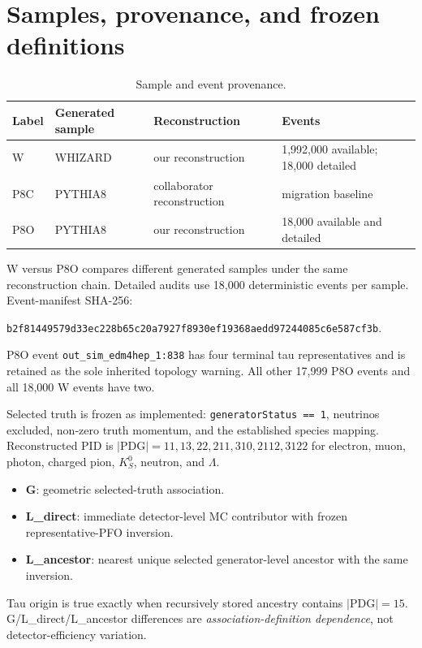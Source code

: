 \documentclass[11pt,a4paper]{article}
\newcommand{\code}[1]{\texttt{#1}}
\begin{document}
\section{Samples, provenance, and frozen definitions}

\begin{table}[H]\centering
\caption{Sample and event provenance.}
\begin{tabular}{llll}
\toprule Label & Generated sample & Reconstruction & Events \\
\midrule
W & WHIZARD & our reconstruction & 1,992,000 available; 18,000 detailed \\
P8C & PYTHIA8 & collaborator reconstruction & migration baseline \\
P8O & PYTHIA8 & our reconstruction & 18,000 available and detailed \\
\bottomrule
\end{tabular}
\end{table}

W versus P8O compares different generated samples under the same reconstruction chain. Detailed audits use 18,000 deterministic events per sample. Event-manifest SHA-256:
\begin{center}\small\code{b2f81449579d33ec228b65c20a7927f8930ef19368aedd97244085c6e587cf3b}.\end{center}

P8O event \code{out\_sim\_edm4hep\_1:838} has four terminal tau representatives and is retained as the sole inherited topology warning. All other 17,999 P8O events and all 18,000 W events have two.

Selected truth is frozen as implemented: \code{generatorStatus == 1}, neutrinos excluded, non-zero truth momentum, and the established species mapping. \linebreak Reconstructed PID is $|\mathrm{PDG}|=11,13,22,211,310,2112,3122$ for electron, muon, photon, charged pion, $K^0_S$, neutron, and $\Lambda$.

\begin{itemize}
\item \textbf{G}: geometric selected-truth association.
\item \textbf{L\_direct}: immediate detector-level MC contributor with frozen representative-PFO inversion.
\item \textbf{L\_ancestor}: nearest unique selected generator-level ancestor with the same inversion.
\end{itemize}

Tau origin is true exactly when recursively stored ancestry contains $|\mathrm{PDG}|=15$. G/L\_direct/L\_ancestor differences are \emph{association-definition dependence}, not detector-efficiency variation.
\end{document}
